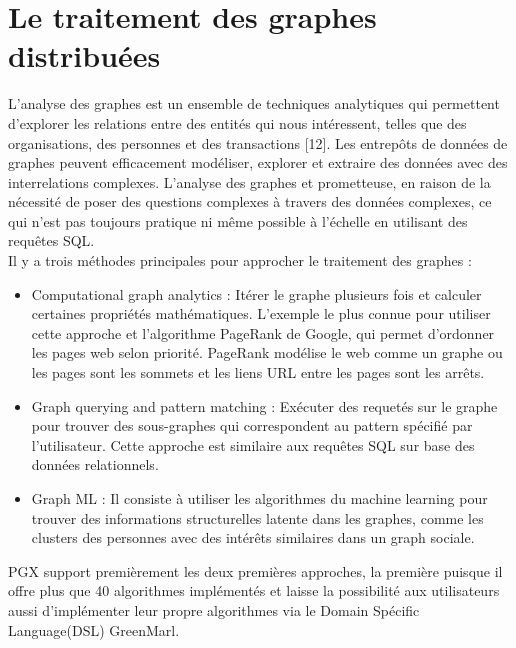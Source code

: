 \section{Le traitement des graphes distribuées}
L'analyse des graphes est un ensemble de techniques analytiques qui permettent d'explorer les relations entre des entités qui nous intéressent, telles que des organisations, des personnes et des transactions [12]. Les entrepôts de données de graphes peuvent efficacement modéliser, explorer et extraire des données avec des interrelations complexes. L'analyse des graphes et prometteuse, en raison de la nécessité de poser des questions complexes à travers des données complexes, ce qui n'est pas toujours pratique ni même possible à l'échelle en utilisant des requêtes SQL.\\
Il y a trois méthodes principales pour approcher le traitement des graphes :

\begin{itemize}[label=\textbullet]
\item  Computational graph analytics : Itérer le graphe plusieurs fois et calculer certaines propriétés mathématiques. L’exemple le plus connue pour utiliser cette approche et l’algorithme PageRank de Google, qui permet d’ordonner les pages web selon priorité. PageRank modélise le web comme un graphe ou les pages sont les sommets et les liens URL entre les pages sont les arrêts.
\item  Graph querying and pattern matching : Exécuter des requetés sur le graphe pour trouver des sous-graphes qui correspondent au pattern spécifié par l’utilisateur. Cette approche est similaire aux requêtes SQL sur base des données relationnels.
\item  Graph ML : Il consiste à utiliser les algorithmes du machine learning pour trouver des informations structurelles latente dans les graphes, comme les clusters des personnes avec des intérêts similaires dans un graph sociale.
\end{itemize}

PGX support premièrement les deux premières approches, la première puisque il offre plus que 40 algorithmes implémentés et laisse la possibilité aux utilisateurs aussi d’implémenter leur propre algorithmes via le Domain Spécific Language(DSL) GreenMarl.
